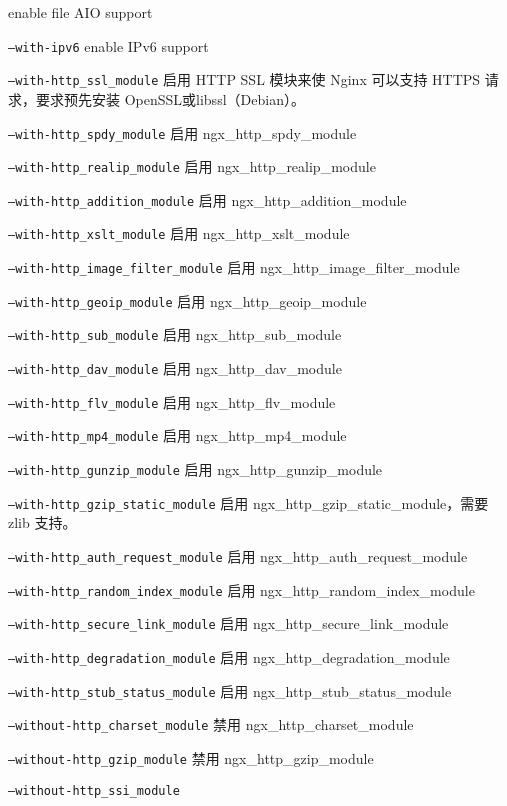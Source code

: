 \begin{compactitem}
enable file AIO support
\item \texttt{--with-ipv6}
enable IPv6 support
\item \texttt{--with-http\_ssl\_module}
启用 HTTP SSL 模块来使 Nginx 可以支持 HTTPS 请求，要求预先安装 OpenSSL或libssl（Debian）。
\item \texttt{--with-http\_spdy\_module}
启用 ngx\_http\_spdy\_module
\item \texttt{--with-http\_realip\_module}
启用 ngx\_http\_realip\_module
\item \texttt{--with-http\_addition\_module}
启用 ngx\_http\_addition\_module
\item \texttt{--with-http\_xslt\_module}
启用 ngx\_http\_xslt\_module
\item \texttt{--with-http\_image\_filter\_module}
启用 ngx\_http\_image\_filter\_module
\item \texttt{--with-http\_geoip\_module}
启用 ngx\_http\_geoip\_module
\item \texttt{--with-http\_sub\_module}
启用 ngx\_http\_sub\_module
\item \texttt{--with-http\_dav\_module}
启用 ngx\_http\_dav\_module
\item \texttt{--with-http\_flv\_module}
启用 ngx\_http\_flv\_module
\item \texttt{--with-http\_mp4\_module}
启用 ngx\_http\_mp4\_module
\item \texttt{--with-http\_gunzip\_module}
启用 ngx\_http\_gunzip\_module
\item \texttt{--with-http\_gzip\_static\_module}
启用 ngx\_http\_gzip\_static\_module，需要 zlib 支持。
\item \texttt{--with-http\_auth\_request\_module}
启用 ngx\_http\_auth\_request\_module
\item \texttt{--with-http\_random\_index\_module}
启用 ngx\_http\_random\_index\_module
\item \texttt{--with-http\_secure\_link\_module}
启用 ngx\_http\_secure\_link\_module
\item \texttt{--with-http\_degradation\_module}
启用 ngx\_http\_degradation\_module
\item \texttt{--with-http\_stub\_status\_module}
启用 ngx\_http\_stub\_status\_module
\item \texttt{--without-http\_charset\_module}
禁用 ngx\_http\_charset\_module
\item \texttt{--without-http\_gzip\_module}
禁用 ngx\_http\_gzip\_module
\item \texttt{--without-http\_ssi\_module}

\end{compactitem}
